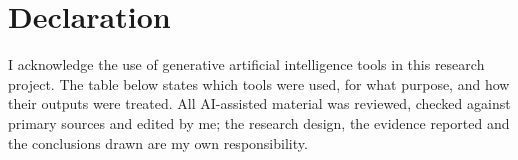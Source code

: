 %
%
\chapter*{Declaration}

I acknowledge the use of generative artificial intelligence tools in this research
project. The table below states which tools were used, for what purpose, and how
their outputs were treated. All AI-assisted material was reviewed, checked against
primary sources and edited by me; the research design, the evidence reported and the
conclusions drawn are my own responsibility.

